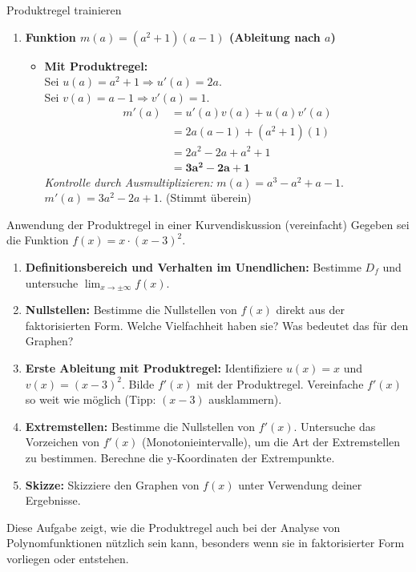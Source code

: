 \begin{loesungsumgebung}{Produktregel trainieren}
\begin{enumerate}[label=(\alph*)]
    \item \textbf{Funktion $m(a) = (a^2+1)(a-1)$ (Ableitung nach $a$)}
    \begin{itemize}
        \item \textbf{Mit Produktregel:} \\
        Sei $u(a) = a^2+1 \Rightarrow u'(a) = 2a$. \\
        Sei $v(a) = a-1 \Rightarrow v'(a) = 1$.
        \begin{align*}
        m'(a) &= u'(a)v(a) + u(a)v'(a) \\
               &= 2a(a-1) + (a^2+1)(1) \\
               &= 2a^2 - 2a + a^2 + 1 \\
               &= \mathbf{3a^2 - 2a + 1}
        \end{align*}
        \textit{Kontrolle durch Ausmultiplizieren:}
        $m(a) = a^3 - a^2 + a - 1$.
        $m'(a) = 3a^2 - 2a + 1$. (Stimmt überein)
    \end{itemize}
\end{enumerate}

\end{loesungsumgebung}

\begin{aufgabenumgebung}[A:ProduktregelAnwendung]{Anwendung der Produktregel in einer Kurvendiskussion (vereinfacht)}
Gegeben sei die Funktion $f(x) = x \cdot (x-3)^2$.
\begin{enumerate}
    \item \textbf{Definitionsbereich und Verhalten im Unendlichen:} Bestimme $D_f$ und untersuche $\lim_{x \to \pm\infty} f(x)$.
    \item \textbf{Nullstellen:} Bestimme die Nullstellen von $f(x)$ direkt aus der faktorisierten Form. Welche Vielfachheit haben sie? Was bedeutet das für den Graphen?
    \item \textbf{Erste Ableitung mit Produktregel:}
        Identifiziere $u(x)=x$ und $v(x)=(x-3)^2$. 
        Bilde $f'(x)$ mit der Produktregel. Vereinfache $f'(x)$ so weit wie möglich (Tipp: $(x-3)$ ausklammern).
    \item \textbf{Extremstellen:} Bestimme die Nullstellen von $f'(x)$. Untersuche das Vorzeichen von $f'(x)$ (Monotonieintervalle), um die Art der Extremstellen zu bestimmen. Berechne die y-Koordinaten der Extrempunkte.
    \item \textbf{Skizze:} Skizziere den Graphen von $f(x)$ unter Verwendung deiner Ergebnisse.
\end{enumerate}
Diese Aufgabe zeigt, wie die Produktregel auch bei der Analyse von Polynomfunktionen nützlich sein kann, besonders wenn sie in faktorisierter Form vorliegen oder entstehen.
\end{aufgabenumgebung}


